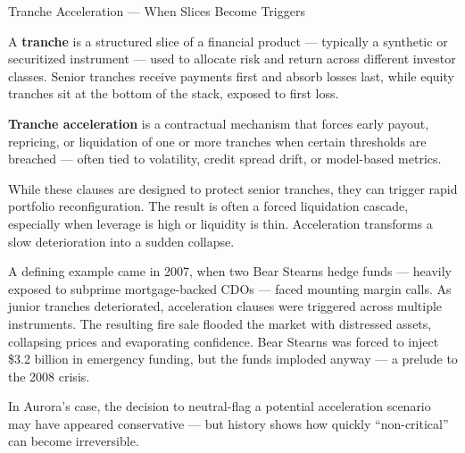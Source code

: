 \begin{TechnicalSidebar}{Tranche Acceleration — When Slices Become Triggers}

  A \textbf{tranche} is a structured slice of a financial product — typically a synthetic or securitized 
  instrument — used to allocate risk and return across different investor classes. Senior tranches receive 
  payments first and absorb losses last, while equity tranches sit at the bottom of the stack, exposed to 
  first loss.

  \medskip

  \textbf{Tranche acceleration} is a contractual mechanism that forces early payout, repricing, or 
  liquidation of one or more tranches when certain thresholds are breached — often tied to volatility, credit 
  spread drift, or model-based metrics.

  \medskip
  
  While these clauses are designed to protect senior tranches, they can trigger rapid portfolio reconfiguration. 
  The result is often a forced liquidation cascade, especially when leverage is high or liquidity is thin. 
  Acceleration transforms a slow deterioration into a sudden collapse.

  \medskip
  
  A defining example came in 2007, when two Bear Stearns hedge funds — heavily exposed to subprime mortgage-backed 
  CDOs — faced mounting margin calls. As junior tranches deteriorated, acceleration clauses were triggered across 
  multiple instruments. The resulting fire sale flooded the market with distressed assets, collapsing prices and 
  evaporating confidence. Bear Stearns was forced to inject \$3.2 billion in emergency funding, but the funds 
  imploded anyway — a prelude to the 2008 crisis.

  \medskip
  
  In Aurora’s case, the decision to neutral-flag a potential acceleration scenario may have appeared conservative 
  — but history shows how quickly “non-critical” can become irreversible.
  
\end{TechnicalSidebar}

\medskip

